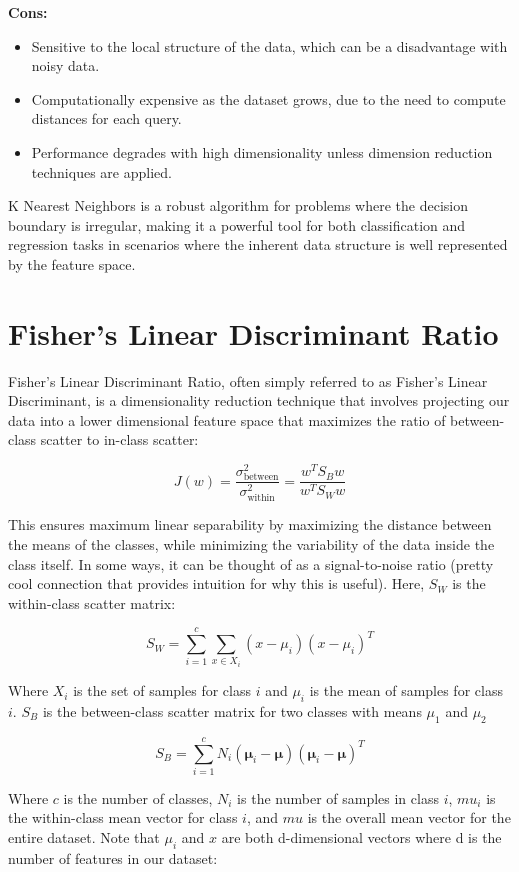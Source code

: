 \documentclass[12pt]{article}
\begin{document}
\textbf{Cons:}
\begin{itemize}
    \item Sensitive to the local structure of the data, which can be a disadvantage with noisy data.
    \item Computationally expensive as the dataset grows, due to the need to compute distances for each query.
    \item Performance degrades with high dimensionality unless dimension reduction techniques are applied.
\end{itemize}

K Nearest Neighbors is a robust algorithm for problems where the decision boundary is irregular, making it a powerful tool for both classification and regression tasks in scenarios where the inherent data structure is well represented by the feature space.


\section{Fisher's Linear Discriminant Ratio}


Fisher's Linear Discriminant Ratio, often simply referred to as Fisher's Linear Discriminant, is a dimensionality reduction technique that involves projecting our data into a lower dimensional feature space that maximizes the ratio of between-class scatter to in-class scatter:

\[ J(w) = \frac{\sigma_{\text{between}}^2}{\sigma_{\text{within}}^2} = \frac{w^T S_B w}{w^T S_W w} \] 

This ensures maximum linear separability by maximizing the distance between the means of the classes, while minimizing the variability of the data inside the class itself. In some ways, it can be thought of as a signal-to-noise ratio (pretty cool connection that provides intuition for why this is useful). Here, \( S_W \) is the within-class scatter matrix: 

\[ S_W = \sum_{i=1}^{c} \sum_{x \in X_i} (x - \mu_i)(x - \mu_i)^T \]

Where \( X_i \) is the set of samples for class \( i \) and \( \mu_i \) is the mean of samples for class \( i \). \( S_B \) is the between-class scatter matrix for two classes with means \( \mu_1 \) and \( \mu_2 \)

\[S_B = \sum_{i=1}^{c} N_i (\boldsymbol{\mu}_i - \boldsymbol{\mu})(\boldsymbol{\mu}_i - \boldsymbol{\mu})^T\]

Where \(c\) is the number of classes, \(N_i\) is the number of samples in class \(i\), \(mu_i\) is the within-class mean vector for class \(i\), and \(mu\) is the overall mean vector for the entire dataset. Note that \(\mu_i\) and \(x\) are both d-dimensional vectors where d is the number of features in our dataset:
\end{document}
